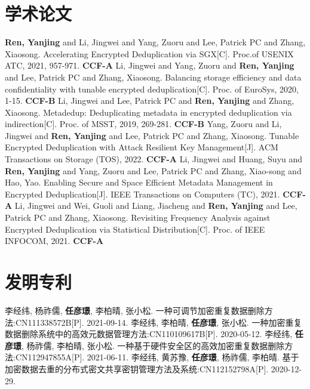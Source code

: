 \documentclass[master]{thesis-uestc}
\begin{document}
\begin{thesistheaccomplish}
    \section{学术论文}
     \textbf{Ren, Yanjing} and Li, Jingwei and Yang, Zuoru and Lee, Patrick PC and Zhang, Xiaosong. Accelerating Encrypted Deduplication via SGX[C]. Proc.of USENIX ATC, 2021, 957-971. \textbf{CCF-A}
     Li, Jingwei and Yang, Zuoru and \textbf{Ren, Yanjing} and Lee, Patrick PC and Zhang, Xiaosong. Balancing storage efficiency and data confidentiality with tunable encrypted deduplication[C]. Proc. of EuroSys, 2020, 1-15. \textbf{CCF-B}
     Li, Jingwei and Lee, Patrick PC and \textbf{Ren, Yanjing} and Zhang, Xiaosong. Metadedup: Deduplicating metadata in encrypted deduplication via indirection[C]. Proc. of MSST, 2019, 269-281. \textbf{CCF-B}
     Yang, Zuoru and Li, Jingwei and \textbf{Ren, Yanjing} and Lee, Patrick PC and Zhang, Xiaosong. Tunable Encrypted Deduplication with Attack Resilient Key Management[J]. ACM Transactions on Storage (TOS), 2022. \textbf{CCF-A}
     Li, Jingwei and Huang, Suyu and \textbf{Ren, Yanjing} and Yang, Zuoru and Lee, Patrick PC and Zhang, Xiao-song and Hao, Yao. Enabling Secure and Space Efficient Metadata Management in Encrypted Deduplication[J]. IEEE Transactions on Computers (TC), 2021. \textbf{CCF-A}
     Li, Jingwei and Wei, Guoli and Liang, Jiacheng and \textbf{Ren, Yanjing} and Lee, Patrick PC and Zhang, Xiaosong. Revisiting Frequency Analysis against Encrypted Deduplication via Statistical Distribution[C]. Proc. of IEEE INFOCOM, 2021. \textbf{CCF-A}
    \section{发明专利}
     李经纬, 杨祚儒, \textbf{任彦璟}, 李柏晴, 张小松. 一种可调节加密重复数据删除方法:CN111338572B[P]. 2021-09-14.
     李经纬, 李柏晴, \textbf{任彦璟}, 张小松. 一种加密重复数据删除系统中的高效元数据管理方法:CN110109617B[P]. 2020-05-12.
     李经纬, \textbf{任彦璟}, 杨祚儒, 李柏晴, 张小松. 一种基于硬件安全区的高效加密重复数据删除方法:CN112947855A[P]. 2021-06-11.
     李经纬, 黄苏豫, \textbf{任彦璟}, 杨祚儒, 李柏晴. 基于加密数据去重的分布式密文共享密钥管理方法及系统:CN112152798A[P]. 2020-12-29.
\end{thesistheaccomplish}
\end{document}
